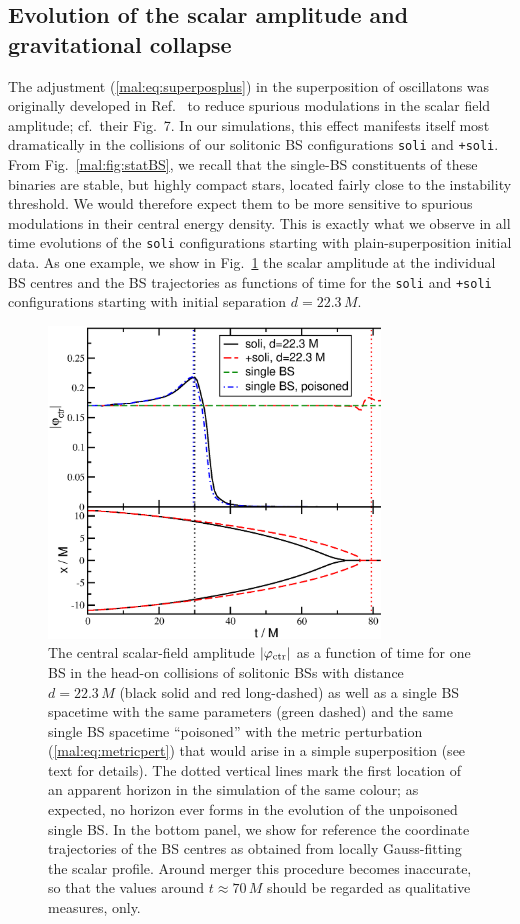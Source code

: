 \subsection{Evolution of the scalar amplitude and gravitational collapse}
%
The adjustment (\ref{mal:eq:superposplus}) in the superposition of oscillatons
was originally developed in Ref.~\cite{Helfer:2018vtq} to reduce
spurious modulations in the scalar field amplitude; cf.~their
Fig.~7. In our simulations, this effect manifests itself
most dramatically in the collisions of our solitonic BS
configurations {\tt soli} and {\tt +soli}.
From Fig.~\ref{mal:fig:statBS}, we recall that the single-BS constituents
of these binaries are stable, but highly compact stars, located
fairly close to the instability threshold. We would therefore expect
them to be more sensitive to spurious modulations in their central
energy density. This is exactly what we observe in all time evolutions
of the {\tt soli} configurations starting with plain-superposition
initial data. As one example, we show
in Fig.~\ref{mal:fig:soli_ampctr} the scalar amplitude
at the individual BS centres and the BS trajectories
as functions of time for the
{\tt soli} and {\tt +soli} configurations starting with initial
separation $d=22.3\,M$.
%
\begin{figure}
    \centering
    \includegraphics[width=250pt]{malaise_source/ampctr_sBS.eps}
    \caption{The central scalar-field amplitude $|\varphi_{\rm ctr}|$ 
    as a function of time for one BS in the head-on
    collisions of solitonic BSs with distance $d=22.3\,M$
    (black solid and red long-dashed) as well as a single
    BS spacetime with the same parameters (green dashed)
    and the same single BS spacetime ``poisoned'' with
    the metric perturbation (\ref{mal:eq:metricpert}) that would arise in a simple
    superposition (see text for details). The dotted
    vertical lines mark the first location of an
    apparent horizon in the simulation of the same colour;
    as expected, no horizon ever forms in the evolution
    of the unpoisoned single BS.
    In the bottom panel, we show for reference the coordinate
    trajectories of the BS centres as obtained from locally
    Gauss-fitting the scalar profile. Around merger this procedure
    becomes inaccurate, so that the values around $t\approx 70\,M$
    should be regarded as qualitative measures, only.
    }
    \label{mal:fig:soli_ampctr}
\end{figure}

